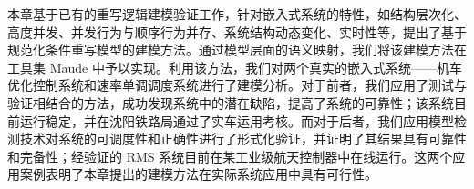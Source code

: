 本章基于已有的重写逻辑建模验证工作，针对嵌入式系统的特性，如结构层次化、高度并发、并发行为与顺序行为并存、系统结构动态变化、实时性等，提出了基于规范化条件重写模型的建模方法。通过模型层面的语义映射，我们将该建模方法在工具集 Maude 中予以实现。利用该方法，我们对两个真实的嵌入式系统——机车优化控制系统和速率单调调度系统进行了建模分析。对于前者，我们应用了测试与验证相结合的方法，成功发现系统中的潜在缺陷，提高了系统的可靠性；该系统目前运行稳定，并在沈阳铁路局通过了实车运用考核。而对于后者，我们应用模型检测技术对系统的可调度性和正确性进行了形式化验证，并证明了其结果具有可靠性和完备性；经验证的 RMS 系统目前在某工业级航天控制器中在线运行。这两个应用案例表明了本章提出的建模方法在实际系统应用中具有可行性。
